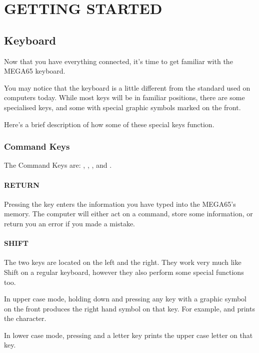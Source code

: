 \chapter{GETTING STARTED}
\section{Keyboard}

Now that you have everything connected, it's time to get familiar with the MEGA65 keyboard.

You may notice that the keyboard is a little different from the standard used on computers today. While most keys will be in familiar positions, there are some specialised keys, and some with special graphic symbols marked on the front.

Here's a brief description of how some of these special keys function.

\subsection{Command Keys}

The Command Keys are: , , , \megasymbolkey and .

\subsubsection{RETURN}

Pressing the  key enters the information you have typed into the MEGA65's memory. The computer will either act on a command, store some information, or return you an error if you made a mistake.

\subsubsection{SHIFT}

The two  keys are located on the left and the right. They work very much like Shift on a regular keyboard, however they also perform some special functions too.

In upper case mode, holding down  and pressing any key with a graphic symbol on the front produces the right hand symbol on that key. For example,  and  prints the character.

In lower case mode, pressing  and a letter key prints the upper case letter on that key.

